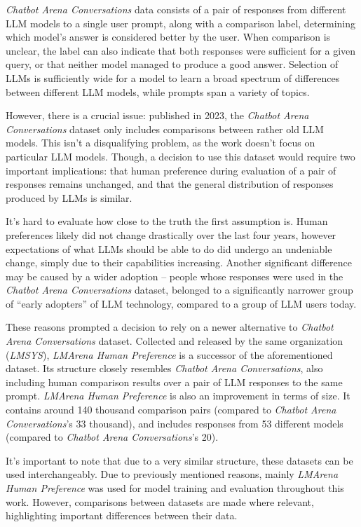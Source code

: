 \documentclass[a4paper,11pt,twoside]{report}
\theoremstyle{definition}
\begin{document}
\textit{Chatbot Arena Conversations} data consists of a pair of responses from different LLM models to a single user prompt, along with a comparison label, determining which model's answer is considered better by the user. When comparison is unclear, the label can also indicate that both responses were sufficient for a given query, or that neither model managed to produce a good answer. Selection of LLMs is sufficiently wide for a model to learn a broad spectrum of differences between different LLM models, while prompts span a variety of topics. 

However, there is a crucial issue: published in 2023, the \textit{Chatbot Arena Conversations} dataset only includes comparisons between rather old LLM models. This isn't a disqualifying problem, as the work doesn't focus on particular LLM models. Though, a decision to use this dataset would require two important implications: that human preference during evaluation of a pair of responses remains unchanged, and that the general distribution of responses produced by LLMs is similar.

It's hard to evaluate how close to the truth the first assumption is. Human preferences likely did not change drastically over the last four years, however expectations of what LLMs should be able to do did undergo an undeniable change, simply due to their capabilities increasing. Another significant difference may be caused by a wider adoption -- people whose responses were used in the \textit{Chatbot Arena Conversations} dataset, belonged to a significantly narrower group of ``early adopters'' of LLM technology, compared to a group of LLM users today.

These reasons prompted a decision to rely on a newer alternative to \textit{Chatbot Arena Conversations} dataset. Collected and released by the same organization (\textit{LMSYS}), \textit{LMArena Human Preference} \cite{lmsys2024lmarena} is a successor of the aforementioned dataset. Its structure closely resembles \textit{Chatbot Arena Conversations}, also including human comparison results over a pair of LLM responses to the same prompt. \textit{LMArena Human Preference} is also an improvement in terms of size. It contains around 140 thousand comparison pairs (compared to \textit{Chatbot Arena Conversations}'s 33 thousand), and includes responses from 53 different models (compared to \textit{Chatbot Arena Conversations}'s 20).

It's important to note that due to a very similar structure, these datasets can be used interchangeably. Due to previously mentioned reasons, mainly \textit{LMArena Human Preference} was used for model training and evaluation throughout this work. However, comparisons between datasets are made where relevant, highlighting important differences between their data.
\end{document}
